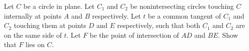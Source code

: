 Let $ C$ be a circle in plane. Let $ C_1$ and $ C_2$ be nonintersecting circles touching $ C$ internally at points $ A$ and $ B$ respectively. Let $ t$ be a common tangent of $ C_1$ and $ C_2$ touching them at points $ D$ and $ E$ respectively, such that both $ C_1$ and $ C_2$ are on the same side of $ t$. Let $ F$ be the point of intersection of $ AD$ and $ BE$. Show that $ F$ lies on $ C$.